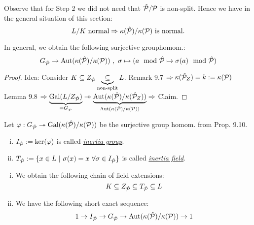 \begin{Bem}
Observe that for Step 2 we did not need that $\hat{\mathcal{P}}/\mathcal{P}$ is non-split. Hence we have in the general situation of this section:
\[ L/K \text{ normal} \Rightarrow \kappa(\hat{\mathcal{P}}) / \kappa(\mathcal{P}) \text{ is normal}.\]
\end{Bem}

\begin{Prop}
In general, we obtain the following surjective grouphomom.:
\[G_{\hat{\mathcal{P}}} \to \operatorname{Aut}(\kappa(\hat{\mathcal{P}})/\kappa(\mathcal{P})) \ , \  \sigma \mapsto (a \mod {\hat{\mathcal{P}}} \mapsto \sigma(a) \mod {\hat{\mathcal{P}}})\]
\end{Prop}

\begin{proof}
Idea: Consider $K \subseteq Z_{\hat{\mathcal{P}}} \underbrace{\subseteq}_{\text{non-split}} L$. Remark 9.7 $\Rightarrow \kappa(\hat{\mathcal{P}}_Z) =k:=\kappa(\mathcal{P})$\\
Lemma 9.8 $\Rightarrow \underbrace{\operatorname{Gal}(L/Z_{\hat{\mathcal{P}}})}_{=G_{\hat{\mathcal{P}}}} \twoheadrightarrow \underbrace{\operatorname{Aut}(\kappa(\hat{\mathcal{P}})/\kappa(\hat{\mathcal{P}}_Z))}_{\operatorname{Aut}(\kappa(\hat{\mathcal{P}})/\kappa(\mathcal{P}))} \Rightarrow$ Claim.
\end{proof}

\begin{defi}
Let $\varphi: G_{\hat{\mathcal{P}}} \twoheadrightarrow \operatorname{Gal}(\kappa(\hat{\mathcal{P}})/\kappa(\mathcal{P}))$ be the surjective group homom. from Prop. 9.10.
\begin{enumerate}[i)]
\item $I_{\hat{\mathcal{P}}}:=\ker(\varphi)$ is called \emph{\underline{inertia group}}.
\item $T_{\hP}:=\{x \in L \ | \ \sigma(x)=x \ \forall \sigma \in I_{\hP}\}$ is called \emph{\underline{inertia field}}.
\end{enumerate}
\end{defi}

\begin{Bem}
\begin{enumerate}[i)]
\item We obtain the following chain of field extensions:
\[ K \subseteq Z_{\hat{\mathcal{P}}} \subseteq T_{\hat{\mathcal{P}}} \subseteq L\]
\item We have the following short exact sequence:
\[ 1 \to I_{\hat{\mathcal{P}}} \to G_{\hat{\mathcal{P}}} \to \operatorname{Aut}(\kappa(\hat{\mathcal{P}})/\kappa(\mathcal{P})) \to 1\]
\end{enumerate}
\end{Bem}

